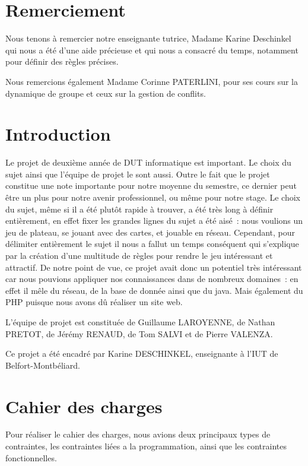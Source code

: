 \documentclass[a4paper, titlepage]{livret}
\begin{document}
\maketitle
\tableofcontents

\chapter{Remerciement}
Nous tenons à remercier notre enseignante tutrice, Madame Karine Deschinkel qui nous a été d'une aide précieuse et qui nous a consacré du temps, notamment pour définir des règles précises.

Nous remercions également Madame Corinne PATERLINI, pour ses cours sur la dynamique de groupe et ceux sur la gestion de conflits.

\chapter{Introduction}

	Le projet de deuxième année de DUT informatique est important. Le choix du sujet ainsi que l’équipe de projet le sont aussi. Outre le fait que le projet constitue une note importante pour notre moyenne du semestre, ce dernier peut être un plus pour notre avenir professionnel, ou même pour notre stage. Le choix du sujet, même si il a été plutôt rapide à trouver, a été très long à définir entièrement, en effet fixer les grandes lignes du sujet a été aisé : nous voulions un jeu de plateau, se jouant avec des cartes, et jouable en réseau. Cependant, pour délimiter entièrement le sujet il nous a fallut un temps conséquent qui s'explique par la création d'une multitude de règles pour rendre le jeu intéressant et attractif. De notre point de vue, ce projet avait donc un potentiel très intéressant car nous pouvions appliquer nos connaissances dans de nombreux domaines : en effet il mêle du réseau, de la base de donnée ainsi que du java. Mais également du PHP puisque nous avons dû réaliser un site web.
	
	L'équipe de projet est constituée de Guillaume LAROYENNE, de Nathan PRETOT, de Jérémy RENAUD, de Tom SALVI et de Pierre VALENZA.
	
	Ce projet a été encadré par Karine DESCHINKEL, enseignante à l'IUT de Belfort-Montbéliard. 

\chapter{Cahier des charges}
  Pour réaliser le cahier des charges, nous avions deux principaux types de contraintes, les contraintes liées a la programmation, ainsi que les contraintes fonctionnelles.
\end{document}
